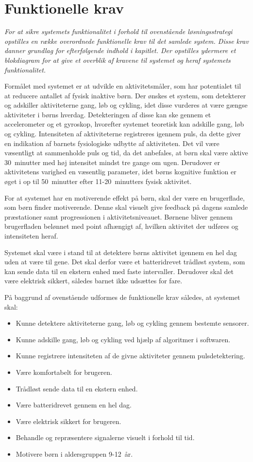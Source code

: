 \section{Funktionelle krav}\label{funktionellekrav}
\textit{For at sikre systemets funktionalitet i forhold til ovenstående løsningsstrategi opstilles en række overordnede funktionelle krav til det samlede system. Disse krav danner grundlag for efterfølgende indhold i kapitlet. Der opstilles ydermere et blokdiagram for at give et overblik af kravene til systemet og heraf systemets funktionalitet.}

Formålet med systemet er at udvikle en aktivitetsmåler, som har potentialet til at reducere antallet af fysisk inaktive børn. Der ønskes et system, som detekterer og adskiller aktiviteterne gang, løb og cykling, idet disse vurderes at være gængse aktiviteter i børns hverdag. Detekteringen af disse kan ske gennem et accelerometer og et gyroskop, hvorefter systemet teoretisk kan adskille gang, løb og cykling. Intensiteten af aktiviteterne registreres igennem puls, da dette giver en indikation af barnets fysiologiske udbytte af aktiviteten. Det vil være væsentligt at sammenholde puls og tid, da det anbefales, at børn skal være aktive 30~minutter med høj intensitet mindst tre gange om ugen. Derudover er aktivitetens varighed en væsentlig parameter, idet børns kognitive funktion er øget i op til 50~minutter efter 11-20~minutters fysisk aktivitet.

For at systemet har en motiverende effekt på børn, skal der være en brugerflade, som børn finder motiverende. Denne skal visuelt give feedback på dagens samlede præstationer samt progressionen i aktivitetsniveauet. Børnene bliver gennem brugerfladen belønnet med point afhængigt af, hvilken aktivitet der udføres og intensiteten heraf.  

Systemet skal være i stand til at detektere børns aktivitet igennem en hel dag uden at være til gene. Det skal derfor være et batteridrevet trådløst system, som kan sende data til en ekstern enhed med faste intervaller. Derudover skal det være elektrisk sikkert, således barnet ikke udsættes for fare. 

På baggrund af ovenstående udformes de funktionelle krav således, at systemet skal: 
\begin{itemize}
	\item Kunne detektere aktiviteterne gang, løb og cykling gennem bestemte sensorer.
	\item Kunne adskille gang, løb og cykling ved hjælp af algoritmer i softwaren.
	\item Kunne registrere intensiteten af de givne aktiviteter gennem pulsdetektering.
	\item Være komfortabelt for brugeren.
	\item Trådløst sende data til en ekstern enhed.
	\item Være batteridrevet gennem en hel dag.
	\item Være elektrisk sikkert for brugeren.
	\item Behandle og repræsentere signalerne visuelt i forhold til tid.
	\item Motivere børn i aldersgruppen 9-12~år. 
\end{itemize}

